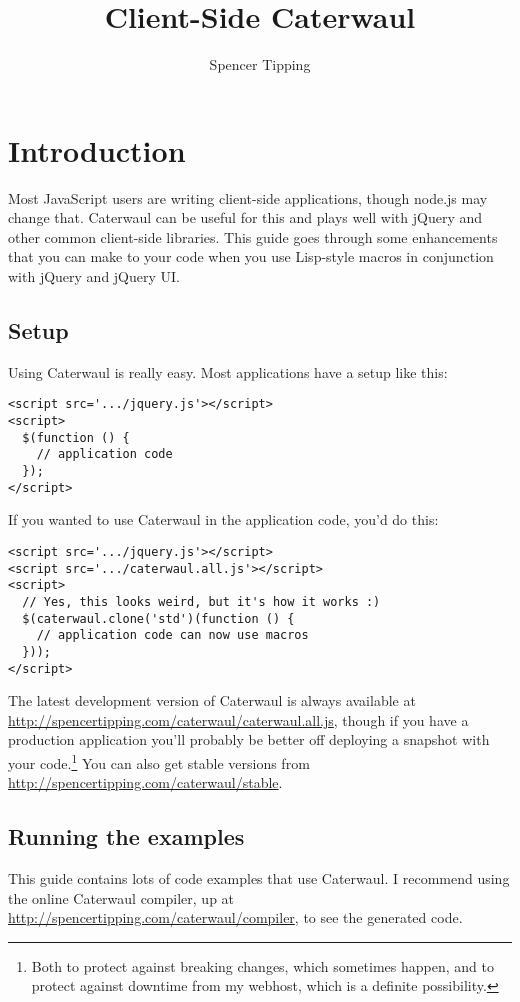 \documentclass{report}
\title{Client-Side Caterwaul}
\author{Spencer Tipping}
\begin{document}
\maketitle{}
\tableofcontents{}

\chapter{Introduction}\label{sec:introduction}
  Most JavaScript users are writing client-side applications, though node.js may change that. Caterwaul can be useful for this and plays well with jQuery and other common client-side
  libraries. This guide goes through some enhancements that you can make to your code when you use Lisp-style macros in conjunction with jQuery and jQuery UI.

\section{Setup}\label{sec:introduction-setup}
    Using Caterwaul is really easy. Most applications have a setup like this:

\begin{verbatim}
<script src='.../jquery.js'></script>
<script>
  $(function () {
    // application code
  });
</script>
\end{verbatim}

    If you wanted to use Caterwaul in the application code, you'd do this:

\begin{verbatim}
<script src='.../jquery.js'></script>
<script src='.../caterwaul.all.js'></script>
<script>
  // Yes, this looks weird, but it's how it works :)
  $(caterwaul.clone('std')(function () {
    // application code can now use macros
  }));
</script>
\end{verbatim}

    The latest development version of Caterwaul is always available at \url{http://spencertipping.com/caterwaul/caterwaul.all.js}, though if you have a production application you'll probably
    be better off deploying a snapshot with your code.\footnote{Both to protect against breaking changes, which sometimes happen, and to protect against downtime from my webhost, which is a
    definite possibility.} You can also get stable versions from \url{http://spencertipping.com/caterwaul/stable}.

\section{Running the examples}\label{sec:introduction-running-the-examples}
    This guide contains lots of code examples that use Caterwaul. I recommend using the online Caterwaul compiler, up at \url{http://spencertipping.com/caterwaul/compiler}, to see the
    generated code.
\end{document}
